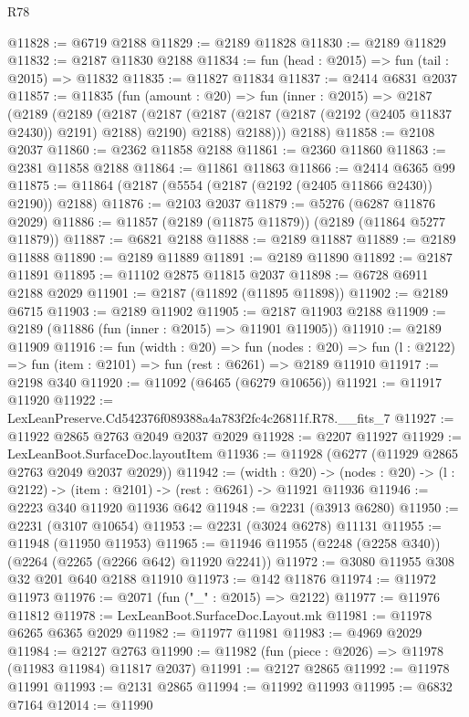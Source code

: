 \begin{lexlean}{R78}
\begin{coremodule}
@11828 := @6719 @2188
@11829 := @2189 @11828
@11830 := @2189 @11829
@11832 := @2187 @11830 @2188
@11834 := fun (head : @2015) => fun (tail : @2015) => @11832
@11835 := @11827 @11834
@11837 := @2414 @6831 @2037
@11857 := @11835
    (fun (amount : @20) =>
    fun (inner : @2015) =>
    @2187
      (@2189
        (@2189
          (@2187
            (@2187 (@2187 (@2187 (@2187 (@2192 (@2405 @11837 @2430)) @2191) @2188) @2190) @2188)
            @2188)))
      @2188)
@11858 := @2108 @2037
@11860 := @2362 @11858 @2188
@11861 := @2360 @11860
@11863 := @2381 @11858 @2188
@11864 := @11861 @11863
@11866 := @2414 @6365 @99
@11875 := @11864 (@2187 (@5554 (@2187 (@2192 (@2405 @11866 @2430)) @2190)) @2188)
@11876 := @2103 @2037
@11879 := @5276 (@6287 @11876 @2029)
@11886 := @11857 (@2189 (@11875 @11879)) (@2189 (@11864 @5277 @11879))
@11887 := @6821 @2188
@11888 := @2189 @11887
@11889 := @2189 @11888
@11890 := @2189 @11889
@11891 := @2189 @11890
@11892 := @2187 @11891
@11895 := @11102 @2875 @11815 @2037
@11898 := @6728 @6911 @2188 @2029
@11901 := @2187 (@11892 (@11895 @11898))
@11902 := @2189 @6715
@11903 := @2189 @11902
@11905 := @2187 @11903 @2188
@11909 := @2189 (@11886 (fun (inner : @2015) => @11901 @11905))
@11910 := @2189 @11909
@11916 := fun (width : @20) =>
  fun (nodes : @20) => fun (l : @2122) => fun (item : @2101) => fun (rest : @6261) => @2189 @11910
@11917 := @2198 @340
@11920 := @11092 (@6465 (@6279 @10656))
@11921 := @11917 @11920
@11922 := LexLeanPreserve.Cd542376f089388a4a783f2fc4c26811f.R78.__fits_7
@11927 := @11922 @2865 @2763 @2049 @2037 @2029
@11928 := @2207 @11927
@11929 := LexLeanBoot.SurfaceDoc.layoutItem
@11936 := @11928 (@6277 (@11929 @2865 @2763 @2049 @2037 @2029))
@11942 := (width : @20) ->
  (nodes : @20) -> (l : @2122) -> (item : @2101) -> (rest : @6261) -> @11921 @11936
@11946 := @2223 @340 @11920 @11936 @642
@11948 := @2231 (@3913 @6280)
@11950 := @2231 (@3107 @10654)
@11953 := @2231 (@3024 @6278) @11131
@11955 := @11948 (@11950 @11953)
@11965 := @11946 @11955 (@2248 (@2258 @340)) (@2264 (@2265 (@2266 @642) @11920 @2241))
@11972 := @3080 @11955 @308 @32 @201 @640 @2188 @11910
@11973 := @142 @11876
@11974 := @11972 @11973
@11976 := @2071 (fun ("_" : @2015) => @2122)
@11977 := @11976 @11812
@11978 := LexLeanBoot.SurfaceDoc.Layout.mk
@11981 := @11978 @6265 @6365 @2029
@11982 := @11977 @11981
@11983 := @4969 @2029
@11984 := @2127 @2763
@11990 := @11982 (fun (piece : @2026) => @11978 (@11983 @11984) @11817 @2037)
@11991 := @2127 @2865
@11992 := @11978 @11991
@11993 := @2131 @2865
@11994 := @11992 @11993
@11995 := @6832 @7164
@12014 := @11990

\end{coremodule}
\end{lexlean}

